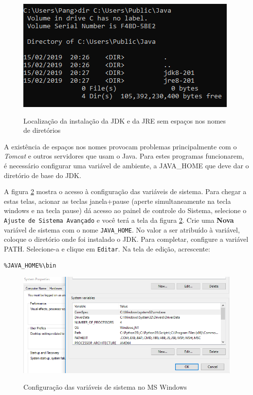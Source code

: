 \documentclass[
	12pt,				%
	twoside,			%
	a4paper,			%
	english,			%
	french,				%
	spanish,			%
	brazil				%
	]{abntex2}
\begin{document}
\begin{figure}[h]
\begin{center}
\includegraphics[scale=0.5]{jdk-dirs.png} 
\caption{Localização da instalação da JDK e da JRE sem espaços nos nomes de diretórios}
\label{jdk-dirs}
\end{center}
\end{figure}

A existência de espaços nos nomes provocam problemas principalmente com o \emph{Tomcat} e outros servidores que usam o Java. Para estes programas funcionarem, é necessário configurar uma variável de ambiente, a JAVA\_HOME que deve dar o diretório de base do JDK.

A figura \ref{sys-var} mostra o acesso à configuração das variáveis de sistema. Para chegar a estas telas, acionar as teclas janela+pause (aperte simultaneamente na tecla windows e na tecla pause) dá acesso ao painel de controle do Sistema, selecione o \texttt{Ajuste de Sistema Avançado} e você terá a tela da figura \ref{sys-var}. Crie uma \textbf{Nova} variável de sistema com o nome \texttt{JAVA\_HOME}. No valor a ser atribuído à variável, coloque o diretório onde foi instalado o JDK. Para completar, configure a variável PATH. Selecione-a e clique em \texttt{Editar}. Na tela de edição, acrescente:

\begin{verbatim}
%JAVA_HOME%\bin
\end{verbatim}

\begin{figure}[h]
\begin{center}
\includegraphics[scale=0.5]{sys-var.png} 
\caption{Configuração das variáveis de sistema no MS Windows}
\label{sys-var}
\end{center}
\end{figure}
\end{document}
